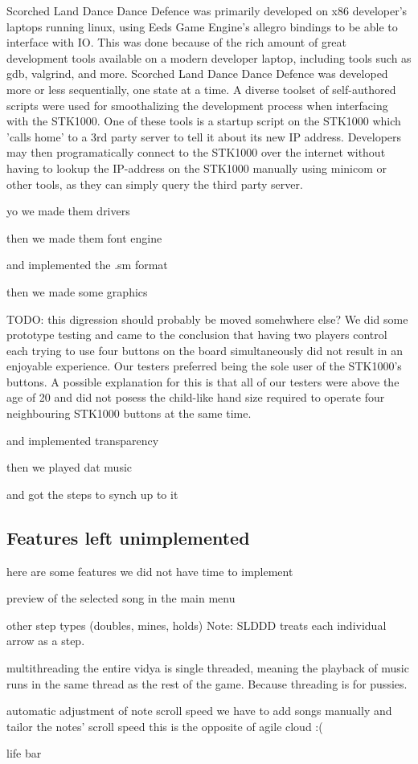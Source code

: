 Scorched Land Dance Dance Defence was primarily developed on x86 developer's laptops running linux, using Eeds Game Engine's allegro bindings to be able to interface with IO.
This was done because of the rich amount of great development tools available on a modern developer laptop, including tools such as gdb, valgrind, and more.
Scorched Land Dance Dance Defence was developed more or less sequentially, one state at a time.
A diverse toolset of self-authored scripts were used for smoothalizing the development process when interfacing with the STK1000.
One of these tools is a startup script on the STK1000 which 'calls home' to a 3rd party server to tell it about its new IP address.
Developers may then programatically connect to the STK1000 over the internet without having to lookup the IP-address on the STK1000 manually using minicom or other tools, as they can simply query the third party server.


yo we made them drivers

then we made them font engine

and implemented the .sm format

then we made some graphics

TODO: this digression should probably be moved somehwhere else?
We did some prototype testing and came to the conclusion that having two players control each trying to use four buttons on the board simultaneously did not result in an enjoyable experience.
Our testers preferred being the sole user of the STK1000's buttons.
A possible explanation for this is that all of our testers were above the age of 20 and did not posess the child-like hand size required to operate four neighbouring STK1000 buttons at the same time.

and implemented transparency

then we played dat music

and got the steps to synch up to it

\subsection{Features left unimplemented}
	here are some features we did not have time to implement


	preview of the selected song in the main menu

	other step types (doubles, mines, holds)
		Note: SLDDD treats each individual arrow as a step. 

	multithreading
		the entire vidya is single threaded, meaning the playback of music runs in the same thread as the rest of the game. Because threading is for pussies.

	automatic adjustment of note scroll speed
		we have to add songs manually and tailor the notes' scroll speed
		this is the opposite of agile cloud :(

	life bar

